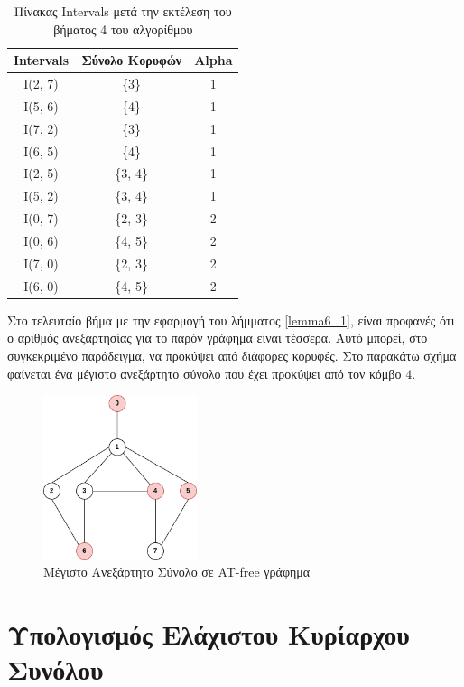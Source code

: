 \begin{table}[H]
	\centering
	\caption{Πίνακας Intervals μετά την εκτέλεση του βήματος 4 του αλγορίθμου}
	\begin{tabular}{|c|c|c|}
		\hline
		\textbf{Intervals} & \textbf{Σύνολο Κορυφών} & \textbf{Alpha} \\
		\hline
		I(2, 7) & \{3\} & 1 \\
		I(5, 6) & \{4\} & 1 \\
		I(7, 2) & \{3\} & 1 \\
		I(6, 5) & \{4\} & 1 \\
		I(2, 5) & \{3, 4\} & 1 \\
		I(5, 2) & \{3, 4\} & 1 \\
		I(0, 7) & \{2, 3\} & 2 \\
		I(0, 6) & \{4, 5\} & 2 \\
		I(7, 0) & \{2, 3\} & 2 \\
		I(6, 0) & \{4, 5\} & 2 \\
		\hline
	\end{tabular}
	\label{table:computed-alpha-intervals}
\end{table}

Στο τελευταίο βήμα με την εφαρμογή του λήμματος \ref{lemma6_1}, είναι προφανές ότι ο αριθμός ανεξαρτησίας για το παρόν γράφημα είναι τέσσερα. Αυτό μπορεί, στο συγκεκριμένο παράδειγμα, να προκύψει από διάφορες κορυφές. Στο παρακάτω  σχήμα φαίνεται ένα μέγιστο ανεξάρτητο σύνολο που έχει προκύψει από τον κόμβο $4$.

\begin{figure}[H]
	\centering
	\includegraphics[width=0.4\textwidth]{pictures/at-free-graph.intependent-set.png} 
	\caption{Μέγιστο Ανεξάρτητο Σύνολο σε AT-free γράφημα}
	\label{fig:at-free-graph-independent-set}
\end{figure}


\section{Υπολογισμός Ελάχιστου Κυρίαρχου Συνόλου}
\label{sec:Domination_Set_Alg}

